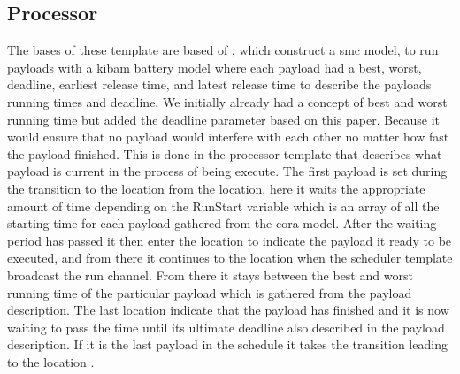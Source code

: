 \subsection*{Processor}
The bases of these template are based of \cite{battery_aware_scheduling}, which construct a \gls{smc} model, to run payloads with a \gls{kibam} battery model where each payload had a best, worst, deadline, earliest release time, and latest release time to describe the payloads running times and deadline. We initially already had a concept of best and worst running time but added the deadline parameter based on this paper. Because it would ensure that no payload would interfere with each other no matter how fast the payload finished. This is done in the processor template that describes what payload is current in the process of being execute. The first payload is set during the transition to the  location from the  location, here it waits the appropriate amount of time depending on the RunStart variable which is an array of all the starting time for each payload gathered from the \gls{cora} model. After the waiting period has passed it then enter the  location to indicate the payload it ready to be executed, and from there it continues to the  location when the scheduler template broadcast the run channel. From there it stays between the best and worst running time of the particular payload which is gathered from the payload description. The last location  indicate that the payload has finished and it is now waiting to pass the time until its ultimate deadline also described in the payload description. If it is the last payload in the schedule it takes the transition leading to the location .

